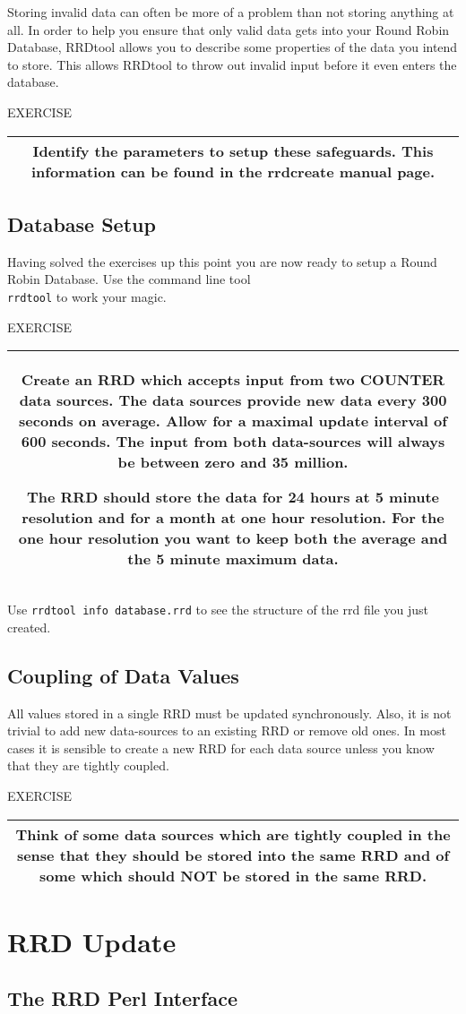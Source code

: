 \documentclass[a4paper,12pt]{article}
\newenvironment{work}{\textsf{\tiny EXERCISE}\nopagebreak\\[0.3ex]\begin{tabular}{|c|}
 \hline
 \begin{minipage}{0.965\linewidth}%
 \setlength{\parskip}{1.6ex plus 0.6ex minus 0.4ex}%
 \rule{0pt}{2.8ex}\ignorespaces}
{\rule[-1.8ex]{0pt}{0pt}\end{minipage}\\
 \hline
 \end{tabular}}
\newcommand{\ex}[1]{\subsection{#1}}
\newcommand{\cmd}[1]{\texttt{\mbox{#1}}}
\begin{document}
Storing invalid data can often be more of a problem than not storing
anything at all. In order to help you ensure that only valid data gets
into your Round Robin Database, RRDtool allows you to
describe some properties of the data you intend to store. This allows
RRDtool to throw out invalid input before it even enters the database.

\begin{work}
Identify the parameters to setup these safeguards. This information
can be found in the rrdcreate manual page.\end{work}

\ex{Database Setup}

Having solved the exercises up this point you are now ready to setup a
Round Robin Database. Use the command line tool\\
\cmd{rrdtool} to work your magic. 

\begin{work}
  Create an RRD which accepts input from two COUNTER
  data sources. The data sources provide new data every 300 seconds on
  average. Allow for a maximal update interval of 600 seconds. The
  input from both data-sources will always be between zero and 35
  million.
  
  The RRD should store the data for 24 hours at 5 minute resolution
  and for a month at one hour resolution. For the one hour resolution
  you want to keep both the average and the 5 minute maximum data.

\end{work}

Use \cmd{rrdtool info database.rrd} to see the structure of the rrd file you
just created.

\ex{Coupling of Data Values}

All values stored in a single RRD must be updated synchronously. Also,
it is not trivial to add new data-sources to an existing RRD or remove
old ones. In most cases it is sensible to create a new RRD for each
data source unless you know that they are tightly coupled.

\begin{work}
  Think of some data sources which are tightly coupled in the sense that
  they should be stored into the same RRD and of some which should NOT be
  stored in the same RRD.
\end{work}

\newpage
\section{RRD Update}
\ex{The RRD Perl Interface}
\end{document}
